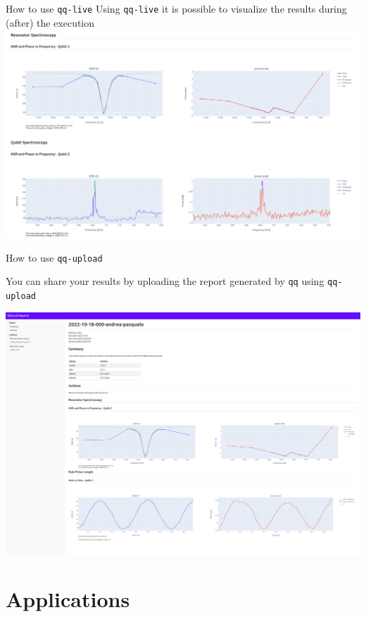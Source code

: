 \documentclass[11p,aspectratio=169]{beamer}
\begin{document}
\begin{frame}{How to use \texttt{qq-live}}
    Using \texttt{qq-live} it is possible to visualize the results during (after) the execution
    \includegraphics[width=\textwidth]{figures/qq-live.png}
\end{frame}

\begin{frame}{How to use \texttt{qq-upload}}
    
    You can share your results by uploading the report generated by \texttt{qq} using \texttt{qq-upload}
    \vspace{0.3cm}
    
    \includegraphics[width=\textwidth]{figures/upload.png}
\end{frame}


\section{Applications}
\end{document}

